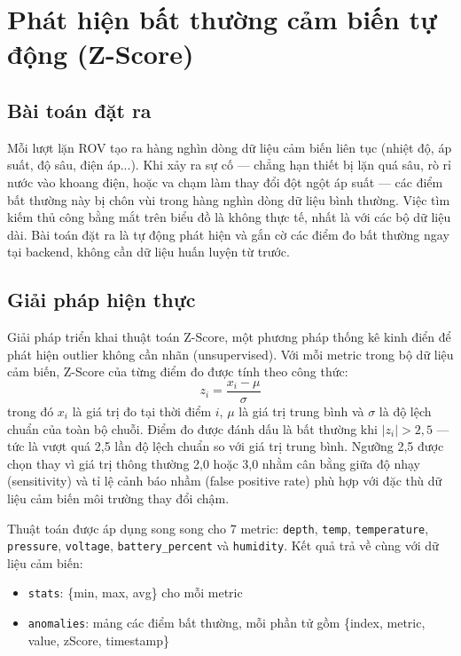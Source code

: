 \documentclass[../DoAn.tex]{subfiles}
\begin{document}
\section{Phát hiện bất thường cảm biến tự động (Z-Score)}
\label{section:5.4}
\subsection{Bài toán đặt ra}
Mỗi lượt lặn ROV tạo ra hàng nghìn dòng dữ liệu cảm biến liên tục (nhiệt độ, áp suất, độ sâu, điện áp...). Khi xảy ra sự cố — chẳng hạn thiết bị lặn quá sâu, rò rỉ nước vào khoang điện, hoặc va chạm làm thay đổi đột ngột áp suất — các điểm bất thường này bị chôn vùi trong hàng nghìn dòng dữ liệu bình thường. Việc tìm kiếm thủ công bằng mắt trên biểu đồ là không thực tế, nhất là với các bộ dữ liệu dài. Bài toán đặt ra là tự động phát hiện và gắn cờ các điểm đo bất thường ngay tại backend, không cần dữ liệu huấn luyện từ trước.

\subsection{Giải pháp hiện thực}
Giải pháp triển khai thuật toán Z-Score, một phương pháp thống kê kinh điển để phát hiện outlier không cần nhãn (unsupervised). Với mỗi metric trong bộ dữ liệu cảm biến, Z-Score của từng điểm đo được tính theo công thức:
\begin{equation}
z_i = \frac{x_i - \mu}{\sigma}
\label{eq:zscore}
\end{equation}
trong đó $x_i$ là giá trị đo tại thời điểm $i$, $\mu$ là giá trị trung bình và $\sigma$ là độ lệch chuẩn của toàn bộ chuỗi. Điểm đo được đánh dấu là bất thường khi $|z_i| > 2{,}5$ — tức là vượt quá 2,5 lần độ lệch chuẩn so với giá trị trung bình. Ngưỡng 2,5 được chọn thay vì giá trị thông thường 2,0 hoặc 3,0 nhằm cân bằng giữa độ nhạy (sensitivity) và tỉ lệ cảnh báo nhầm (false positive rate) phù hợp với đặc thù dữ liệu cảm biến môi trường thay đổi chậm.

Thuật toán được áp dụng song song cho 7 metric: \texttt{depth}, \texttt{temp}, \texttt{temperature}, \texttt{pressure}, \texttt{voltage}, \texttt{battery\_percent} và \texttt{humidity}. Kết quả trả về cùng với dữ liệu cảm biến:
\begin{itemize}[leftmargin=*, topsep=2pt, itemsep=1pt]
    \item \texttt{stats}: \{min, max, avg\} cho mỗi metric
    \item \texttt{anomalies}: mảng các điểm bất thường, mỗi phần tử gồm \{index, metric, value, zScore, timestamp\}
\end{itemize}
\end{document}
